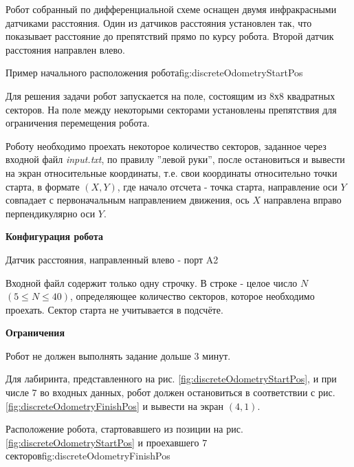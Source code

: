 
Робот собранный по дифференциальной схеме оснащен двумя инфракрасными датчиками расстояния. Один из датчиков расстояния установлен так, что показывает расстояние до препятствий прямо по курсу робота. Второй датчик расстояния направлен влево.

{Пример начального расположения робота}{fig:discreteOdometryStartPos}

Для решения задачи робот запускается на поле, состоящим из 8х8 квадратных секторов. На поле между некоторыми секторами установлены препятствия для ограничения перемещения робота.

Роботу необходимо проехать некоторое количество секторов, заданное через входной файл \textit{input.txt}, по правилу ''левой руки'', после остановиться и вывести на экран относительные координаты, т.е. свои координаты относительно точки старта, в формате $(X, Y)$, где начало отсчета - точка старта, направление оси $Y$ совпадает с первоначальным направлением движения, ось $X$ направлена вправо перпендикулярно оси $Y$.

\begin{center}
\noindent
\textbf{Конфигурация робота}
\end{center}

{Датчик расстояния, направленный влево - порт A2}


Входной файл содержит только одну строчку. В строке - целое число $N$ \linebreak $(5 \leq N \leq 40)$, определяющее количество секторов, которое необходимо проехать. Сектор старта не учитывается в подсчёте.

\begin{center}
\noindent
\textbf{Ограничения}
\end{center}

Робот не должен выполнять задание дольше 3 минут.

\exampleSection

Для лабиринта, представленного на рис. \ref{fig:discreteOdometryStartPos}, и при числе $7$ во входных данных, робот должен остановиться в соответствии с рис. \ref{fig:discreteOdometryFinishPos} и вывести на экран $(4,1)$.

{Расположение робота, стартовавшего из позиции на рис. \ref{fig:discreteOdometryStartPos} и проехавшего $7$ секторов}{fig:discreteOdometryFinishPos}

